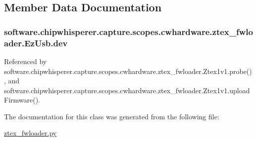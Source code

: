 \subsection{Member Data Documentation}
\hypertarget{classsoftware_1_1chipwhisperer_1_1capture_1_1scopes_1_1cwhardware_1_1ztex__fwloader_1_1EzUsb_ad9513c7220e3dda53b4fb0f1466e8fd1}{}
\subsubsection[{dev}]{\setlength{\rightskip}{0pt plus 5cm}software.\+chipwhisperer.\+capture.\+scopes.\+cwhardware.\+ztex\+\_\+fwloader.\+Ez\+Usb.\+dev}\label{classsoftware_1_1chipwhisperer_1_1capture_1_1scopes_1_1cwhardware_1_1ztex__fwloader_1_1EzUsb_ad9513c7220e3dda53b4fb0f1466e8fd1}


Referenced by software.\+chipwhisperer.\+capture.\+scopes.\+cwhardware.\+ztex\+\_\+fwloader.\+Ztex1v1.\+probe(), and software.\+chipwhisperer.\+capture.\+scopes.\+cwhardware.\+ztex\+\_\+fwloader.\+Ztex1v1.\+upload\+Firmware().



The documentation for this class was generated from the following file\+:\begin{DoxyCompactItemize}
\item 
\hyperlink{ztex__fwloader_8py}{ztex\+\_\+fwloader.\+py}\end{DoxyCompactItemize}
